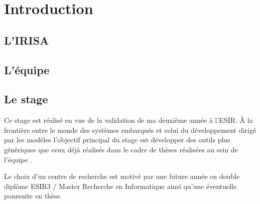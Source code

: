 \section*{Introduction} %
{}

\subsection{L'IRISA}

\subsection{L'équipe \diver}


\subsection{Le stage}
Ce stage est réalisé en vue de la validation de ma deuxième année à l'ESIR. À la frontière entre le monde des systèmes embarqués et celui du développement dirigé par les modèles l'objectif principal du stage est développer des outils plus génériques que ceux déjà réalisés dans le cadre de thèses réalisées au sein de l'équipe \diver.

Le choix d'un centre de recherche est motivé par une future année en double diplôme ESIR3 / Master Recherche en Informatique ainsi qu'une éventuelle poursuite en thèse.